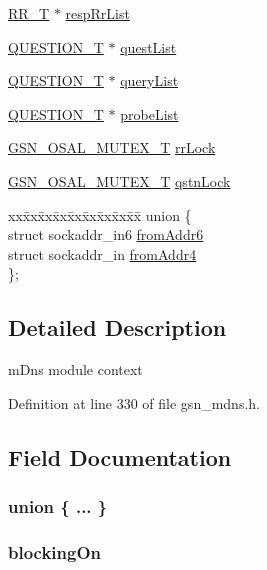 \begin{DoxyCompactItemize}
\item 
\hyperlink{a00457}{RR\_\-T} $\ast$ \hyperlink{a00140_a97a30be7d167f7f9475f806a189936b4}{respRrList}
\item 
\hyperlink{a00455}{QUESTION\_\-T} $\ast$ \hyperlink{a00140_af05820673f965263d157f684be0c1144}{questList}
\item 
\hyperlink{a00455}{QUESTION\_\-T} $\ast$ \hyperlink{a00140_a707cebeea24bf8ac244d818c020c02c8}{queryList}
\item 
\hyperlink{a00455}{QUESTION\_\-T} $\ast$ \hyperlink{a00140_adc2ceee26fcd1703b832c55805ec0fd6}{probeList}
\item 
\hyperlink{a00628_gae997291afc7166c897f459023e0154ad}{GSN\_\-OSAL\_\-MUTEX\_\-T} \hyperlink{a00140_a2c92e0949538471898a153c53e505bed}{rrLock}
\item 
\hyperlink{a00628_gae997291afc7166c897f459023e0154ad}{GSN\_\-OSAL\_\-MUTEX\_\-T} \hyperlink{a00140_a86a9d3f0aacce7c9dda5a46ab2b5a48c}{qstnLock}
\item 
\begin{tabbing}
xx\=xx\=xx\=xx\=xx\=xx\=xx\=xx\=xx\=\kill
union \{\\
\>struct sockaddr\_in6 \hyperlink{a00140_a57fce45abb176348c2c580b064621a65}{fromAddr6}\\
\>struct sockaddr\_in \hyperlink{a00140_adef8b394e1fd1701cf1f63d24339e665}{fromAddr4}\\
\}; \\

\end{tabbing}\end{DoxyCompactItemize}


\subsection{Detailed Description}
mDns module context 

Definition at line 330 of file gsn\_\-mdns.h.



\subsection{Field Documentation}
\hypertarget{a00140_a827dc0f063136bdf421d27f40f2f3fd4}{
\subsubsection[{"@15}]{\setlength{\rightskip}{0pt plus 5cm}union \{ ... \} }}
\label{a00140_a827dc0f063136bdf421d27f40f2f3fd4}
\hypertarget{a00140_ae88d491fc834aaae7cc9c066719d285b}{
\subsubsection[{blockingOn}]{ {\bf blockingOn}}}
\label{a00140_ae88d491fc834aaae7cc9c066719d285b}


